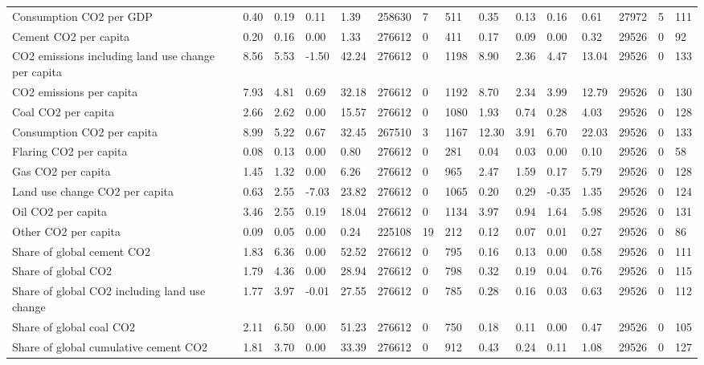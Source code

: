 \begin{longtable}{lllllllllllllll}
Consumption CO2 per GDP & 0.40 & 0.19 & 0.11 & 1.39 & 258630 & 7 & 511 & 0.35 & 0.13 & 0.16 & 0.61 & 27972 & 5 & 111\\
\addlinespace
Cement CO2 per capita & 0.20 & 0.16 & 0.00 & 1.33 & 276612 & 0 & 411 & 0.17 & 0.09 & 0.00 & 0.32 & 29526 & 0 & 92\\
CO2 emissions including land use change per capita & 8.56 & 5.53 & -1.50 & 42.24 & 276612 & 0 & 1198 & 8.90 & 2.36 & 4.47 & 13.04 & 29526 & 0 & 133\\
CO2 emissions per capita & 7.93 & 4.81 & 0.69 & 32.18 & 276612 & 0 & 1192 & 8.70 & 2.34 & 3.99 & 12.79 & 29526 & 0 & 130\\
Coal CO2 per capita & 2.66 & 2.62 & 0.00 & 15.57 & 276612 & 0 & 1080 & 1.93 & 0.74 & 0.28 & 4.03 & 29526 & 0 & 128\\
Consumption CO2 per capita & 8.99 & 5.22 & 0.67 & 32.45 & 267510 & 3 & 1167 & 12.30 & 3.91 & 6.70 & 22.03 & 29526 & 0 & 133\\
\addlinespace
Flaring CO2 per capita & 0.08 & 0.13 & 0.00 & 0.80 & 276612 & 0 & 281 & 0.04 & 0.03 & 0.00 & 0.10 & 29526 & 0 & 58\\
Gas CO2 per capita & 1.45 & 1.32 & 0.00 & 6.26 & 276612 & 0 & 965 & 2.47 & 1.59 & 0.17 & 5.79 & 29526 & 0 & 128\\
Land use change CO2 per capita & 0.63 & 2.55 & -7.03 & 23.82 & 276612 & 0 & 1065 & 0.20 & 0.29 & -0.35 & 1.35 & 29526 & 0 & 124\\
Oil CO2 per capita & 3.46 & 2.55 & 0.19 & 18.04 & 276612 & 0 & 1134 & 3.97 & 0.94 & 1.64 & 5.98 & 29526 & 0 & 131\\
Other CO2 per capita & 0.09 & 0.05 & 0.00 & 0.24 & 225108 & 19 & 212 & 0.12 & 0.07 & 0.01 & 0.27 & 29526 & 0 & 86\\
\addlinespace
Share of global cement CO2 & 1.83 & 6.36 & 0.00 & 52.52 & 276612 & 0 & 795 & 0.16 & 0.13 & 0.00 & 0.58 & 29526 & 0 & 111\\
Share of global CO2 & 1.79 & 4.36 & 0.00 & 28.94 & 276612 & 0 & 798 & 0.32 & 0.19 & 0.04 & 0.76 & 29526 & 0 & 115\\
Share of global CO2 including land use change & 1.77 & 3.97 & -0.01 & 27.55 & 276612 & 0 & 785 & 0.28 & 0.16 & 0.03 & 0.63 & 29526 & 0 & 112\\
Share of global coal CO2 & 2.11 & 6.50 & 0.00 & 51.23 & 276612 & 0 & 750 & 0.18 & 0.11 & 0.00 & 0.47 & 29526 & 0 & 105\\
Share of global cumulative cement CO2 & 1.81 & 3.70 & 0.00 & 33.39 & 276612 & 0 & 912 & 0.43 & 0.24 & 0.11 & 1.08 & 29526 & 0 & 127\\

\end{longtable}
